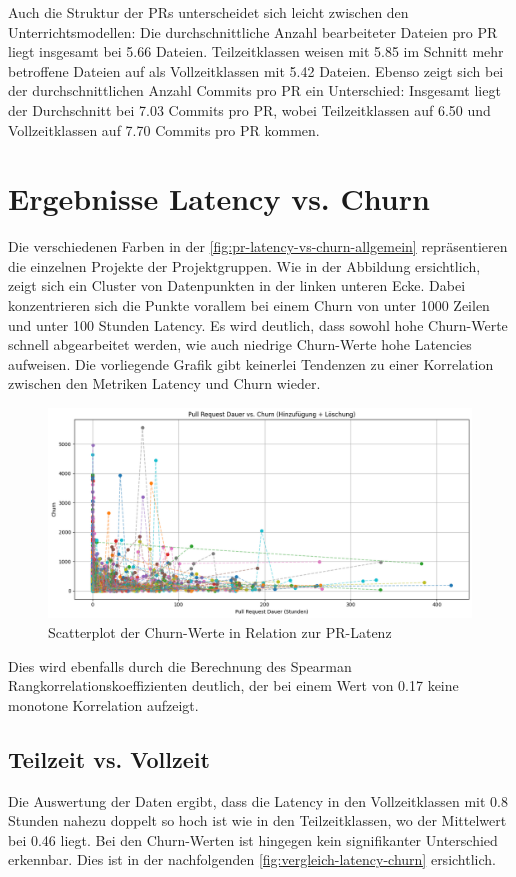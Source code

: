 Auch die Struktur der PRs unterscheidet sich leicht zwischen den Unterrichtsmodellen: Die durchschnittliche Anzahl bearbeiteter Dateien pro PR liegt insgesamt bei 5.66 Dateien. Teilzeitklassen weisen mit 5.85 im Schnitt mehr betroffene Dateien auf als Vollzeitklassen mit 5.42 Dateien. Ebenso zeigt sich bei der durchschnittlichen Anzahl Commits pro PR ein Unterschied: Insgesamt liegt der Durchschnitt bei 7.03 Commits pro PR, wobei Teilzeitklassen auf 6.50 und Vollzeitklassen auf 7.70 Commits pro PR kommen.

\section{Ergebnisse Latency vs. Churn}
Die verschiedenen Farben in der  \autoref{fig:pr-latency-vs-churn-allgemein}  repräsentieren die einzelnen Projekte der Projektgruppen.
Wie in der Abbildung ersichtlich, zeigt sich ein Cluster von Datenpunkten in der linken unteren Ecke. Dabei konzentrieren sich die Punkte vorallem bei einem Churn von unter 1000 Zeilen und unter 100 Stunden Latency. Es wird deutlich, dass sowohl hohe Churn-Werte schnell abgearbeitet werden, wie auch niedrige Churn-Werte hohe Latencies aufweisen. Die vorliegende Grafik gibt keinerlei Tendenzen zu einer Korrelation zwischen den Metriken Latency und Churn wieder.
\begin{figure}[th]
    \centering
    \includegraphics[width=\textwidth]{pr-latency-vs-churn-allgemein.png}
    \caption{Scatterplot der Churn-Werte in Relation zur PR-Latenz}
    \label{fig:pr-latency-vs-churn-allgemein}
\end{figure}

Dies wird ebenfalls durch die Berechnung des Spearman Rangkorrelationskoeffizienten deutlich, der bei einem Wert von 0.17 keine monotone Korrelation aufzeigt.

\subsection{Teilzeit vs. Vollzeit}
Die Auswertung der Daten ergibt, dass die Latency in den Vollzeitklassen mit 0.8 Stunden nahezu doppelt so hoch ist wie in den Teilzeitklassen, wo der Mittelwert bei 0.46 liegt. Bei den Churn-Werten ist hingegen kein signifikanter Unterschied erkennbar. Dies ist in der nachfolgenden \autoref{fig:vergleich-latency-churn} ersichtlich.

